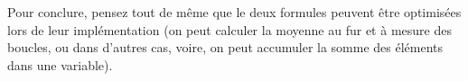 
\bigskip

\noindent Pour conclure, pensez tout de même que le deux formules peuvent être optimisées lors de leur implémentation (on peut calculer la moyenne au fur et à mesure des boucles, ou dans d'autres cas, voire, on peut accumuler la somme des éléments dans une variable).


